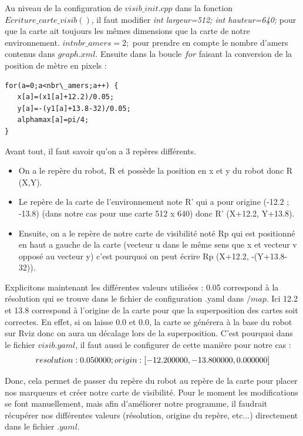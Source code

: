 \documentclass[10pt,a4paper]{article}
\begin{document}
Au niveau de la configuration de $visib\_init.cpp$ dans la fonction $Ecriture\_carte\_visib()$, il faut modifier \textit{int largeur=512;	 int hauteur=640;} pour que la carte ait toujours les mêmes dimensions que la carte de notre environnement. $int nbr\_amers=2;$ pour prendre en compte le nombre d'amers contenus dans $graph.xml$. Ensuite dans la boucle $for$ faisant la conversion de la position de mètre en pixels :
\begin{lstlisting}
for(a=0;a<nbr\_amers;a++) {
   x[a]=(x1[a]+12.2)/0.05;
   y[a]=-(y1[a]+13.8-32)/0.05;
   alphamax[a]=pi/4;
}
\end{lstlisting}

\noindent Avant tout, il faut savoir qu'on a 3 repères différents.
\begin{itemize}
\item On a le repère du robot, R et possède la position en x et y du robot donc R (X,Y).
\item Le repère de la carte de l'environnement note R' qui a pour origine (-12.2 ; -13.8) (dans notre cas pour une carte 512 x 640) donc R' (X+12.2, Y+13.8).
\item Ensuite, on a le repère de notre carte de visibilité noté Rp qui est positionné en haut a gauche de la carte (vecteur u dans le même sens que x et vecteur v opposé au vecteur y) c'est pourquoi on peut écrire Rp (X+12.2, -(Y+13.8-32)).
\end{itemize}


Explicitons maintenant les différentes valeurs utilisées : 0.05 correspond à la résolution qui se trouve dans le fichier de configuration .yaml dans $/map$. Ici 12.2 et 13.8 correspond à l'origine de la carte pour que la superposition des cartes soit correctes. En effet, si on laisse 0.0 et 0.0, la carte se générera à la base du robot sur Rviz donc on aura un décalage lors de la superposition. C'est pourquoi dans le fichier $visib.yaml$, il faut aussi le configurer de cette manière pour notre cas :\\
$$resolution: 0.050000    ; 
origin: [-12.200000, -13.800000, 0.000000]\\
$$

Donc, cela permet de passer du repère du robot au repère de la carte pour placer nos marqueurs et créer notre carte de visibilité. Pour le moment les modifications se font manuellement, mais afin d'améliorer notre programme, il faudrait récupérer nos différentes valeurs (résolution, origine du repère, etc...) directement dans le fichier $.yaml$.\\
\end{document}
